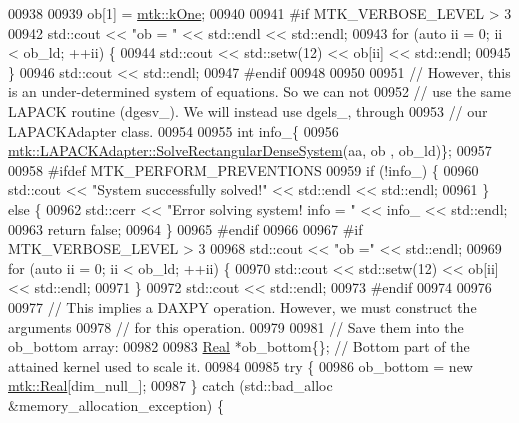 \begin{DoxyCode}
{{00938 
00939     ob[1] = \hyperlink{group__c01-roots_ga26407c24d43b6b95480943340d285c71}{mtk::kOne};
00940 
00941 \textcolor{preprocessor}{    #if MTK\_VERBOSE\_LEVEL > 3}
00942     std::cout << \textcolor{stringliteral}{"ob = "} << std::endl << std::endl;
00943     \textcolor{keywordflow}{for} (\textcolor{keyword}{auto} ii = 0; ii < ob\_ld; ++ii) \{
00944       std::cout << std::setw(12) << ob[ii] << std::endl;
00945     \}
00946     std::cout << std::endl;
00947 \textcolor{preprocessor}{    #endif}
00948 
00950 
00951     \textcolor{comment}{// However, this is an under-determined system of equations. So we can not}
00952     \textcolor{comment}{// use the same LAPACK routine (dgesv\_). We will instead use dgels\_, through}
00953     \textcolor{comment}{// our LAPACKAdapter class.}
00954 
00955     \textcolor{keywordtype}{int} info\_\{
00956       \hyperlink{classmtk_1_1LAPACKAdapter_a380f148ffdf96bae2f79ae28f1a6560c}{mtk::LAPACKAdapter::SolveRectangularDenseSystem}(aa, ob
      , ob\_ld)\};
00957 
00958 \textcolor{preprocessor}{    #ifdef MTK\_PERFORM\_PREVENTIONS}
00959     \textcolor{keywordflow}{if} (!info\_) \{
00960       std::cout << \textcolor{stringliteral}{"System successfully solved!"} << std::endl << std::endl;
00961     \} \textcolor{keywordflow}{else} \{
00962       std::cerr << \textcolor{stringliteral}{"Error solving system! info = "} << info\_ << std::endl;
00963       \textcolor{keywordflow}{return} \textcolor{keyword}{false};
00964     \}
00965 \textcolor{preprocessor}{    #endif}
00966 
00967 \textcolor{preprocessor}{    #if MTK\_VERBOSE\_LEVEL > 3}
00968     std::cout << \textcolor{stringliteral}{"ob ="} << std::endl;
00969     \textcolor{keywordflow}{for} (\textcolor{keyword}{auto} ii = 0; ii < ob\_ld; ++ii) \{
00970       std::cout << std::setw(12) << ob[ii] << std::endl;
00971     \}
00972     std::cout << std::endl;
00973 \textcolor{preprocessor}{    #endif}
00974 
00976 
00977     \textcolor{comment}{// This implies a DAXPY operation. However, we must construct the arguments}
00978     \textcolor{comment}{// for this operation.}
00979 
00981     \textcolor{comment}{// Save them into the ob\_bottom array:}
00982 
00983     \hyperlink{group__c01-roots_gac080bbbf5cbb5502c9f00405f894857d}{Real} *ob\_bottom\{\}; \textcolor{comment}{// Bottom part of the attained kernel used to scale it.}
00984 
00985     \textcolor{keywordflow}{try} \{
00986       ob\_bottom = \textcolor{keyword}{new} \hyperlink{group__c01-roots_gac080bbbf5cbb5502c9f00405f894857d}{mtk::Real}[dim\_null\_];
00987     \} \textcolor{keywordflow}{catch} (std::bad\_alloc &memory\_allocation\_exception) \{
}}
\end{DoxyCode}
